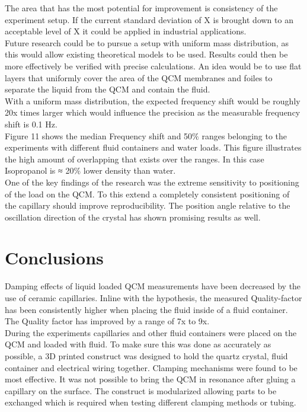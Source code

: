 \documentclass[a4paper, 10pt, conference]{ieeeconf}      %
\begin{document}
    The area that has the most potential for improvement is consistency of the experiment setup.
    If the current standard deviation of X is brought down to an acceptable level of X it could be applied in industrial applications. \\

    Future research could be to pursue a setup with uniform mass distribution, as this would allow existing theoretical models to be used.
    Results could then be more effectively be verified with precise calculations.
    An idea would be to use flat layers that uniformly cover the area of the QCM membranes and foiles to separate the liquid from the QCM and contain the fluid. \\

    With a uniform mass distribution, the expected frequency shift would be roughly 20x times larger which would influence the precision as the measurable frequency shift is 0.1 Hz. \\

    Figure 11 shows the median Frequency shift and 50$\%$ ranges belonging to the experiments with different fluid containers and water loads. This figure illustrates the high amount of overlapping that exists over the ranges. In this case Isopropanol is ≈ 20$\%$ lower density than water. \\

    One of the key findings of the research was the extreme sensitivity to positioning of the load on the QCM. To this extend a completely consistent positioning of the capillary should improve reproducibility. The position angle relative to the oscillation direction of the crystal has shown promising results as well. \\


\section{Conclusions}
    Damping effects of liquid loaded QCM measurements have been decreased by the use of ceramic capillaries.
    Inline with the hypothesis, the measured Quality-factor has been consistently higher when placing the fluid inside of a fluid container.
    The Quality factor has improved by a range of 7x to 9x. \\

    During the experiments capillaries and other fluid containers were placed on the QCM and loaded with fluid.
    To make sure this was done as accurately as possible, a 3D printed construct was designed to hold the quartz crystal, fluid container and electrical wiring together.
    Clamping mechanisms were found to be most effective. It was not possible to bring the QCM in resonance after gluing a capillary on the surface.
    The construct is modularized allowing parts to be exchanged which is required when testing different clamping methods or tubing. \\
\end{document}
